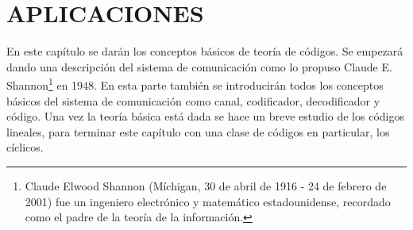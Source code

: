 \chapter{APLICACIONES}
En este capítulo se darán los conceptos básicos de teoría de códigos. Se empezará dando una descripción del sistema de comunicación como lo propuso Claude E. Shannon\footnote{Claude Elwood Shannon (Míchigan, 30 de abril de 1916 - 24 de febrero de 2001) fue un ingeniero electrónico y matemático estadounidense, recordado como el padre de la teoría de la información.} en 1948. En esta parte también se introducirán todos los conceptos básicos del sistema de comunicación como canal, codificador, decodificador y código. Una vez la teoría básica está dada se hace un breve estudio de los códigos lineales, para terminar este capítulo con una clase de códigos en particular, los cíclicos. 

